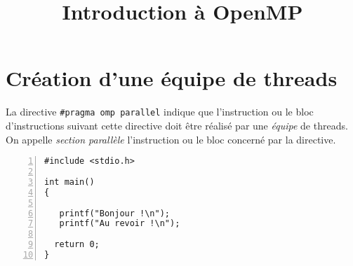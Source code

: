 \documentclass[A4wide]{article}
\title{Introduction à OpenMP}
\date{}
\begin{document}
\maketitle

\section{Création d'une équipe de threads}


La directive \verb&#pragma omp parallel& indique que l'instruction
ou le bloc d'instructions suivant cette directive  doit être réalisé
par une \emph{équipe} de threads. On appelle \emph{section parallèle}
l'instruction ou le bloc concerné par la directive.


\begin{lstlisting}[numbers=left, numberstyle=\tiny, stepnumber=1, numbersep=5pt]
#include <stdio.h>

int main() 
{

   printf("Bonjour !\n");
   printf("Au revoir !\n");

  return 0;
}
\end{lstlisting}
\end{document}
